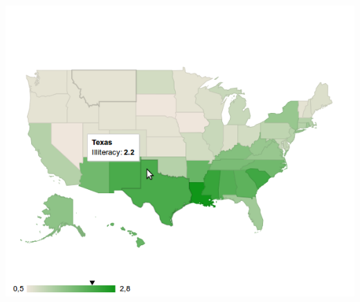 \begin{frame}
\begin{columns}[t]
\begin{column}{.6\textwidth}
{{      \includegraphics[scale=0.3]{images/preview_ggvis}}}
\end{column}
\end{columns}
\end{frame}
